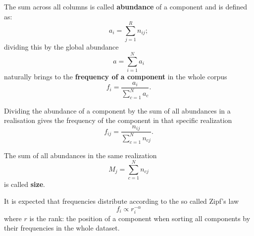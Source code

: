 The sum across all columns is called \textbf{abundance} of a component and is defined as:
\begin{equation}\label{eq:abundance}
a_i=\sum_{j=1}^{R}n_{ij};
\end{equation}
dividing this by the global abundance 
\begin{equation}
  a=\sum_{i=1}^{N}a_i
\end{equation}
naturally brings to the \textbf{frequency of a component} in the whole corpus
\begin{equation}\label{eq:fi}
f_i=\frac{a_i}{\sum_{c=1}^{N}a_{c}}.
\end{equation}

Dividing the abundance of a component by the sum of all abundances in a realisation
 gives the frequency of the component in that specific realization 
\begin{equation}
f_{ij}=\frac{n_{ij}}{\sum_{c=1}^{N}n_{cj}}.
\end{equation}

The sum of all abundances in the same realization
\begin{equation}\label{eq:size}
M_j=\sum_{c=1}^{N}n_{cj}
\end{equation}
is called \textbf{size}.

It is expected that frequencies distribute according to the so called Zipf's law
\begin{equation}\label{eq:zipf}
f_i\propto r_i^{-\alpha}
\end{equation}
where $r$ is the rank: the position of a component when sorting all components
by their frequencies in the whole dataset.